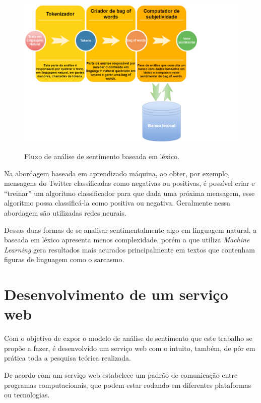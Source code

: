 \begin{figure}[h]
    \centering
    \includegraphics[width=13cm, height=8cm]{imagens/Figura-de-fluxo-analise-lexical.png}
    \caption {Fluxo de análise de sentimento baseada em léxico.}
    \label{fig:fluxoAnaliseLexical}
\end{figure}

Na abordagem baseada em aprendizado máquina, ao obter, por exemplo, mensagens do Twitter classificadas como negativas ou positivas, é possível criar e “treinar” um algoritmo classificador para que dada uma próxima mensagem, esse algoritmo possa classificá-la como positiva ou  negativa. Geralmente nessa abordagem são utilizadas redes neurais.

Dessas duas formas de se analisar sentimentalmente algo em linguagem natural, a baseada em léxico apresenta menos complexidade, porém a que utiliza \textit{Machine Learning} gera resultados mais acurados principalmente em textos que contenham figuras de linguagem como o sarcasmo.  

\section{Desenvolvimento de um serviço web}

Com o objetivo de expor o modelo de análise de sentimento que este trabalho se propõe a fazer, é desenvolvido um serviço web com o intuito, também, de pôr em prática toda a pesquisa teórica realizada.

De acordo com \cite{webService:2004} um serviço web estabelece um padrão de comunicação entre programas computacionais, que podem estar rodando em diferentes plataformas ou tecnologias.

